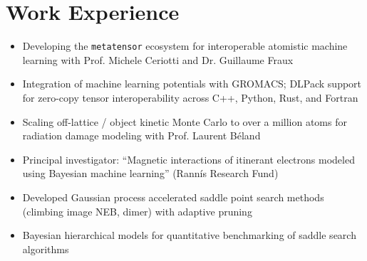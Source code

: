 \documentclass[twopage]{rgcv}
\date{}
\title{}
\begin{document}
\lastupdated

\section{Work Experience}

\begin{itemize}
\item Developing the \texttt{metatensor} ecosystem for interoperable atomistic machine learning with Prof. Michele Ceriotti and Dr. Guillaume Fraux
\item Integration of machine learning potentials with GROMACS; DLPack support for zero-copy tensor interoperability across C++, Python, Rust, and Fortran
\end{itemize}

\sectionspace

\begin{itemize}
\item Scaling off-lattice / object kinetic Monte Carlo to over a million atoms for radiation damage modeling with Prof. Laurent B\'{e}land
\end{itemize}

\sectionspace

\begin{itemize}
\item Principal investigator: ``Magnetic interactions of itinerant electrons modeled using Bayesian machine learning'' (Rann\'{i}s Research Fund)
\item Developed Gaussian process accelerated saddle point search methods (climbing image NEB, dimer) with adaptive pruning
\item Bayesian hierarchical models for quantitative benchmarking of saddle search algorithms
\end{itemize}
\end{document}
